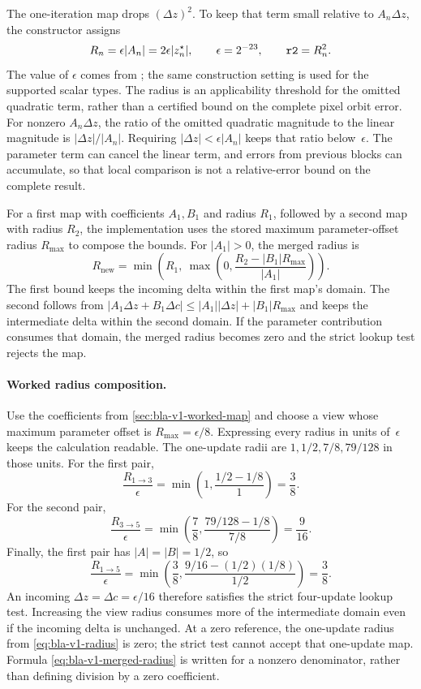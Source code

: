 The one-iteration map drops $(\Delta z)^2$. To keep that term small
relative to $A_n\Delta z$, the constructor assigns
\begin{equation}
R_n=\epsilon |A_n|=2\epsilon |z_n^\star|,
\qquad \epsilon=2^{-23},\qquad \texttt{r2}=R_n^2.
\label{eq:bla-v1-radius}
\end{equation}
The value of $\epsilon$ comes from ; the same
construction setting is used for the supported scalar types. The
radius is an applicability threshold for the omitted quadratic term,
rather than a certified bound on the complete pixel orbit error.
For nonzero $A_n\Delta z$, the ratio of the omitted quadratic magnitude to
the linear magnitude is $|\Delta z|/|A_n|$. Requiring
$|\Delta z|<\epsilon|A_n|$ keeps that ratio below~$\epsilon$. The parameter
term can cancel the linear term, and errors from previous blocks can accumulate,
so that local comparison is not a relative-error bound on the complete result.

For a first map with coefficients $A_1,B_1$ and radius $R_1$, followed
by a second map with radius $R_2$, the implementation uses the stored
maximum parameter-offset radius $R_{\max}$ to compose the bounds.
For $|A_1|>0$, the merged radius is
\begin{equation}
R_{\mathrm{new}}=\min\!\left(
  R_1,\ \max\!\left(0,\frac{R_2-|B_1|R_{\max}}{|A_1|}\right)
\right).
\label{eq:bla-v1-merged-radius}
\end{equation}
The first bound keeps the incoming delta within the first map's domain.
The second follows from
$|A_1\Delta z+B_1\Delta c|\le |A_1||\Delta z|+|B_1|R_{\max}$
and keeps the intermediate delta within the second domain. If the
parameter contribution consumes that domain, the merged radius becomes
zero and the strict lookup test rejects the map.

\paragraph{Worked radius composition.}
Use the coefficients from \cref{sec:bla-v1-worked-map} and choose a view
whose maximum parameter offset is $R_{\max}=\epsilon/8$. Expressing every
radius in units of~$\epsilon$ keeps the calculation readable. The one-update
radii are $1,1/2,7/8,79/128$ in those units. For the first pair,
\[
\frac{R_{1\to3}}{\epsilon}
 =\min\!\left(1,\frac{1/2-1/8}{1}\right)=\frac38.
\]
For the second pair,
\[
\frac{R_{3\to5}}{\epsilon}
 =\min\!\left(\frac78,\frac{79/128-1/8}{7/8}\right)=\frac9{16}.
\]
Finally, the first pair has $|A|=|B|=1/2$, so
\[
\frac{R_{1\to5}}{\epsilon}
 =\min\!\left(\frac38,
     \frac{9/16-(1/2)(1/8)}{1/2}\right)=\frac38.
\]
An incoming $\Delta z=\Delta c=\epsilon/16$ therefore satisfies the
strict four-update lookup test. Increasing the view radius consumes more of
the intermediate domain even if the incoming delta is unchanged. At a zero
reference, the one-update radius from \eqref{eq:bla-v1-radius} is zero;
the strict test cannot accept that one-update map. Formula
\eqref{eq:bla-v1-merged-radius} is written for a nonzero denominator, rather
than defining division by a zero coefficient.

